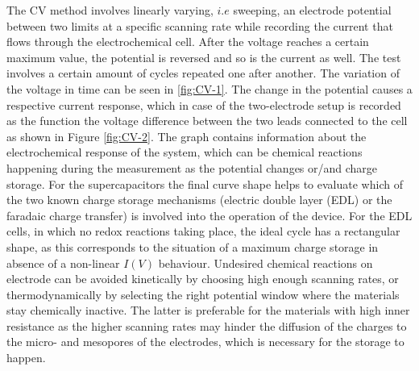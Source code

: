  The CV method involves linearly varying, $i.e$ sweeping, an electrode potential between two limits at a specific scanning rate while recording the current that flows through the electrochemical cell. After the voltage reaches a certain maximum value, the potential is reversed and so is the current as well. The test involves a certain amount of cycles repeated one after another. The variation of the voltage in time can be seen in \ref{fig:CV-1}. The change in the potential causes a respective current response, which in case of the two-electrode setup is recorded as the function the voltage difference between the two leads connected to the cell as shown in Figure \ref{fig:CV-2}. The graph contains information about the electrochemical response of the system, which can be chemical reactions happening during the measurement as the potential changes or/and charge storage. For the supercapacitors the final curve shape helps to evaluate which of the two known charge storage mechanisms (electric double layer (EDL) or the faradaic charge transfer) is involved into the operation of the device. For the EDL cells, in which no redox reactions taking place, the ideal cycle has a rectangular shape, as this corresponds to the situation of a maximum charge storage in absence of a non-linear $I(V)$ behaviour. Undesired chemical reactions on electrode can be avoided kinetically by choosing high enough scanning rates, or thermodynamically by selecting the right potential window where the materials stay chemically inactive. The latter is preferable for the materials with high inner resistance as the higher scanning rates may hinder the diffusion of the charges to the micro- and mesopores of the electrodes, which is necessary for the storage to happen.
 
